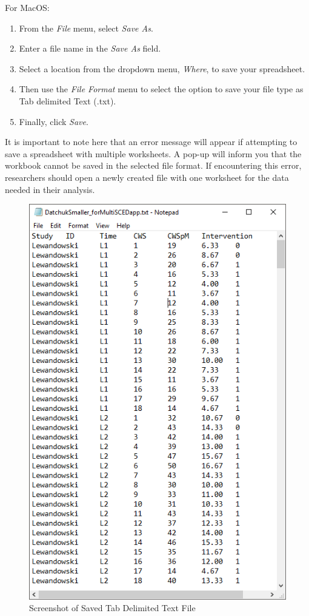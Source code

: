 \documentclass[
]{book}
\providecommand{\tightlist}{%
  \setlength{\itemsep}{0pt}\setlength{\parskip}{0pt}}
\begin{document}
For MacOS:

\begin{enumerate}
\def\labelenumi{\arabic{enumi}.}
\tightlist
\item
  From the \emph{File} menu, select \emph{Save As}.
\item
  Enter a file name in the \emph{Save As} field.
\item
  Select a location from the dropdown menu, \emph{Where}, to save your spreadsheet.
\item
  Then use the \emph{File Format} menu to select the option to save your file type as Tab delimited Text (.txt).
\item
  Finally, click \emph{Save}.
\end{enumerate}

It is important to note here that an error message will appear if attempting to save a spreadsheet with multiple worksheets. A pop-up will inform you that the workbook cannot be saved in the selected file format. If encountering this error, researchers should open a newly created file with one worksheet for the data needed in their analysis.

\begin{figure}
\includegraphics[width=0.6\linewidth]{images/raw_txt.file_Lewandowski2011} \caption{Screenshot of Saved Tab Delimited Text File}\label{fig:Txt-Lewandowski}
\end{figure}
\end{document}
